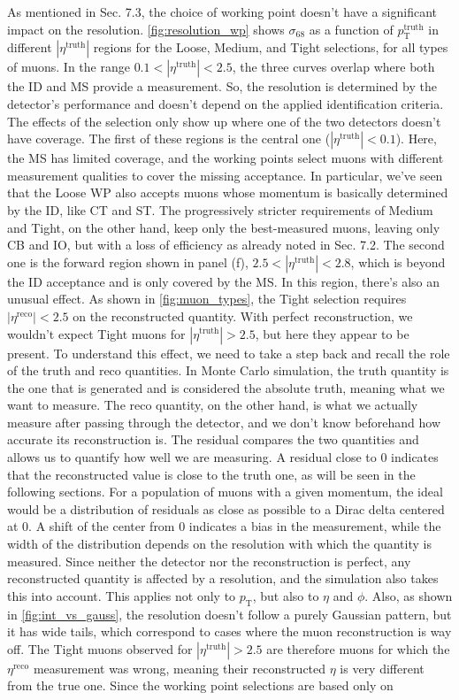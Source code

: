 \documentclass[11pt,a4paper,twoside,openright]{report}
\begin{document}
\noindent As mentioned in Sec. 7.3, the choice of working point doesn't have a significant impact on the resolution. \cref{fig:resolution_wp} shows $\sigma_{68}$ as a function of $p_\mathrm{T}^\mathrm{truth}$ in different $|\eta^\mathrm{truth}|$ regions for the Loose, Medium, and Tight selections, for all types of muons. In the range $0.1 < |\eta^\mathrm{truth}| < 2.5$, the three curves overlap where both the ID and MS provide a measurement. So, the resolution is determined by the detector's performance and doesn't depend on the applied identification criteria. The effects of the selection only show up where one of the two detectors doesn't have coverage. The first of these regions is the central one ($|\eta^\mathrm{truth}| < 0.1$). Here, the MS has limited coverage, and the working points select muons with different measurement qualities to cover the missing acceptance. In particular, we’ve seen that the Loose WP also accepts muons whose momentum is basically determined by the ID, like CT and ST. The progressively stricter requirements of Medium and Tight, on the other hand, keep only the best-measured muons, leaving only CB and IO, but with a loss of efficiency as already noted in Sec. 7.2. The second one is the forward region shown in panel (f), $2.5 < |\eta^\mathrm{truth}| < 2.8$, which is beyond the ID acceptance and is only covered by the MS. In this region, there's also an unusual effect. As shown in \cref{fig:muon_types}, the Tight selection requires $|\eta^\mathrm{reco}| < 2.5$ on the reconstructed quantity. With perfect reconstruction, we wouldn’t expect Tight muons for $|\eta^\mathrm{truth}| > 2.5$, but here they appear to be present. To understand this effect, we need to take a step back and recall the role of the truth and reco quantities. In Monte Carlo simulation, the truth quantity is the one that is generated and is considered the absolute truth, meaning what we want to measure. The reco quantity, on the other hand, is what we actually measure after passing through the detector, and we don't know beforehand how accurate its reconstruction is. The residual compares the two quantities and allows us to quantify how well we are measuring. A residual close to 0 indicates that the reconstructed value is close to the truth one, as will be seen in the following sections. For a population of muons with a given momentum, the ideal would be a distribution of residuals as close as possible to a Dirac delta centered at 0. A shift of the center from 0 indicates a bias in the measurement, while the width of the distribution depends on the resolution with which the quantity is measured. Since neither the detector nor the reconstruction is perfect, any reconstructed quantity is affected by a resolution, and the simulation also takes this into account. This applies not only to $p_\mathrm{T}$, but also to $\eta$ and $\phi$. Also, as shown in \cref{fig:int_vs_gauss}, the resolution doesn’t follow a purely Gaussian pattern, but it has wide tails, which correspond to cases where the muon reconstruction is way off. The Tight muons observed for $|\eta^\mathrm{truth}| > 2.5$ are therefore muons for which the $\eta^\mathrm{reco}$ measurement was wrong, meaning their reconstructed $\eta$ is very different from the true one. Since the working point selections are based only on 
\end{document}
